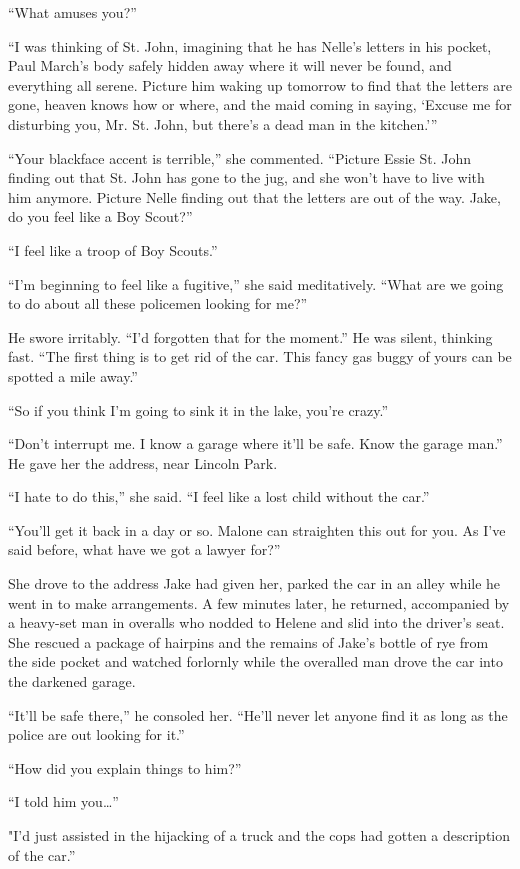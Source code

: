 \documentclass{novel}
\begin{document}
“What amuses you?”

“I was thinking of St. John, imagining that he has Nelle’s letters in his pocket, Paul March’s body safely hidden away where it will never be found, and everything all serene. Picture him waking up tomorrow to find that the letters are gone, heaven knows how or where, and the maid coming in saying, ‘Excuse me for disturbing you, Mr. St. John, but there's a dead man in the kitchen.’”

“Your blackface accent is terrible,” she commented. “Picture Essie St. John finding out that St. John has gone to the jug, and she won’t have to live with him anymore. Picture Nelle finding out that the letters are out of the way. Jake, do you feel like a Boy Scout?”

“I feel like a troop of Boy Scouts.”

“I’m beginning to feel like a fugitive,” she said meditatively. “What are we going to do about all these policemen looking for me?”

He swore irritably. “I’d forgotten that for the moment.” He was silent, thinking fast. “The first thing is to get rid of the car. This fancy gas buggy of yours can be spotted a mile away.”

“So if you think I’m going to sink it in the lake, you’re crazy.”

“Don’t interrupt me. I know a garage where it’ll be safe. Know the garage man.” He gave her the address, near Lincoln Park.

“I hate to do this,” she said. “I feel like a lost child without the car.”

“You’ll get it back in a day or so. Malone can straighten this out for you. As I’ve said before, what have we got a lawyer for?”

She drove to the address Jake had given her, parked the car in an alley while he went in to make arrangements. A few minutes later, he returned, accompanied by a heavy-set man in overalls who nodded to Helene and slid into the driver’s seat. She rescued a package of hairpins and the remains of Jake’s bottle of rye from the side pocket and watched forlornly while the overalled man drove the car into the darkened garage.

“It’ll be safe there,” he consoled her. “He’ll never let anyone find it as long as the police are out looking for it.”

“How did you explain things to him?”

“I told him you…”

"I'd just assisted in the hijacking of a truck and the cops had gotten a description of the car.”
\end{document}
